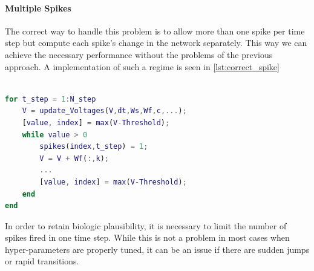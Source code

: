 \paragraph{Multiple Spikes}\label{p:multiple_spikes}
The correct way to handle this problem is to allow more than one spike per time step but compute each spike's change in the network separately. This way we can achieve the necessary performance without the problems of the previous approach. A implementation of such a regime is seen in \cref{lst:correct_spike}

\begin{lstlisting}[language=Matlab, caption=Letting each neurons spike as many times a necessary while computing each spike's influence sequentially.,label=lst:correct_spike]

for t_step = 1:N_step
	V = update_Voltages(V,dt,Ws,Wf,c,...);
	[value, index] = max(V-Threshold);
	while value > 0
		spikes(index,t_step) = 1;
		V = V + Wf(:,k);
		...
		[value, index] = max(V-Threshold);
	end
end
\end{lstlisting}
In order to retain biologic plausibility, it is necessary to limit the number of spikes fired in one time step. While this is not a problem in most cases when hyper-parameters are properly tuned, it can be an issue if there are sudden jumps or rapid transitions.\\

